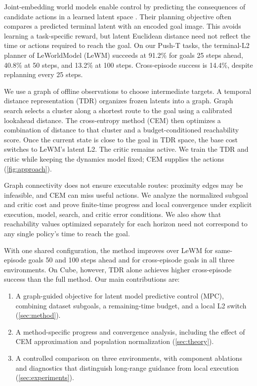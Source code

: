 \documentclass{article} %
\theoremstyle{definition}
\theoremstyle{remark}
\begin{document}
Joint-embedding world models enable control by predicting the consequences of candidate
actions in a learned latent space \citep{dinowm,lewm}. Their planning objective often compares a
predicted terminal latent with an encoded goal image. This avoids learning a task-specific
reward, but latent Euclidean distance need not reflect the time or actions required to reach
the goal. On our Push-T tasks, the terminal-L2 planner of LeWorldModel (LeWM) succeeds at 91.2\% for goals 25 steps
ahead, 40.8\% at 50 steps, and 13.2\% at 100 steps. Cross-episode success is 14.4\%, despite
replanning every 25 steps.

We use a graph of offline observations to choose intermediate targets.
A temporal distance representation (TDR) organizes frozen latents into a graph.
Graph search selects a cluster along a shortest route to the goal using a calibrated
lookahead distance. The cross-entropy method (CEM) then optimizes a combination of distance
to that cluster and a budget-conditioned reachability score. Once the current state is close to the goal in
TDR space, the base cost switches to LeWM's latent L2. The critic remains active.
We train the TDR and critic while keeping the dynamics model fixed; CEM supplies the actions
(\cref{fig:approach}).

Graph connectivity does not ensure executable routes: proximity edges may be infeasible,
and CEM can miss useful actions. We analyze the normalized subgoal and critic cost and prove
finite-time progress and local convergence under explicit execution, model, search,
and critic error conditions. We also show that reachability values optimized separately for each horizon need not correspond to any single policy's time to reach the goal.

With one shared configuration, the method improves over LeWM for same-episode goals 50 and
100 steps ahead and for cross-episode goals in all three environments. On Cube, however, TDR alone achieves higher cross-episode
success than the full method.
Our main contributions are:
\begin{enumerate}[nosep,leftmargin=*]
 \item A graph-guided objective for latent model predictive control (MPC), combining dataset
       subgoals, a remaining-time budget, and a local L2 switch (\cref{sec:method}).
 \item A method-specific progress and convergence analysis, including the effect of CEM
       approximation and population normalization (\cref{sec:theory}).
 \item A controlled comparison on three environments, with component ablations and diagnostics
       that distinguish long-range guidance from local execution (\cref{sec:experiments}).
\end{enumerate}
\end{document}
